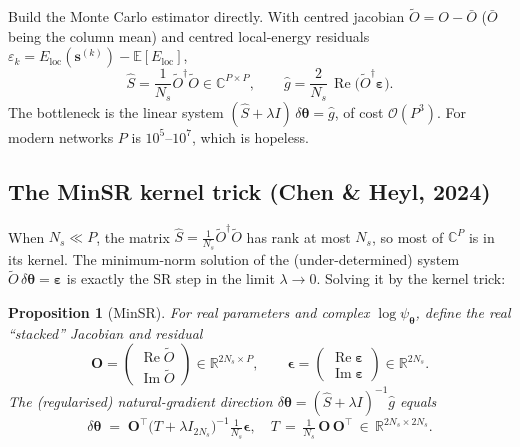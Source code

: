 \documentclass[11pt,a4paper]{article}
\newcommand{\R}{\mathbb{R}}
\newcommand{\C}{\mathbb{C}}
\newcommand{\E}{\mathbb{E}}
\newcommand{\bs}{\bm{s}}
\newcommand{\btheta}{\bm{\theta}}
\newcommand{\psip}{\psi_{\btheta}}
\newcommand{\Eloc}{E_{\mathrm{loc}}}
\DeclareMathOperator{\Real}{Re}
\DeclareMathOperator{\Imag}{Im}
\theoremstyle{definition}
\theoremstyle{plain}
\newtheorem{proposition}{Proposition}
\begin{document}
Build the Monte Carlo estimator directly. With centred jacobian
$\widetilde O = O - \bar O$ ($\bar O$ being the column mean) and centred
local-energy residuals $\varepsilon_{k} = \Eloc(\bs^{(k)}) - \E[\Eloc]$,
\begin{equation}
   \widehat S = \frac{1}{N_{s}}\widetilde O^{\dagger}\widetilde O \in \C^{P\times P},
   \qquad
   \widehat g = \frac{2}{N_{s}}\,\Real\bigl(\widetilde O^{\dagger}\bm{\varepsilon}\bigr).
\end{equation}
The bottleneck is the linear system $(\widehat S + \lambda I)\,\delta\btheta = \widehat g$,
of cost $\mathcal O(P^{3})$. For modern networks $P$ is $10^{5}$--$10^{7}$,
which is hopeless.

\subsection{The MinSR kernel trick (Chen \& Heyl, 2024)}

When $N_{s} \ll P$, the matrix $\widehat S = \tfrac{1}{N_{s}} \widetilde O^{\dagger}\widetilde O$
has rank at most $N_{s}$, so most of $\C^{P}$ is in its kernel. The
minimum-norm solution of the (under-determined) system
$\widetilde O\,\delta\btheta = \bm{\varepsilon}$ is exactly the SR step in
the limit $\lambda \to 0$. Solving it by the kernel trick:

\begin{proposition}[MinSR]
For real parameters and complex $\log\psip$, define the
real ``stacked'' Jacobian and residual
\begin{equation}
   \mathbf O =
   \begin{pmatrix}\Real \widetilde O \\ \Imag \widetilde O\end{pmatrix} \in \R^{2N_{s}\times P},
   \qquad
   \bm{\epsilon} =
   \begin{pmatrix}\Real\bm\varepsilon \\ \Imag\bm\varepsilon\end{pmatrix} \in \R^{2N_{s}}.
\end{equation}
The (regularised) natural-gradient direction $\delta\btheta = (\widehat S + \lambda I)^{-1} \widehat g$ equals
\begin{equation}
\boxed{\;
   \delta\btheta
   \;=\; \mathbf O^{\!\top}
         \bigl(T + \lambda I_{2N_{s}}\bigr)^{-1}
         \tfrac{1}{N_{s}}\bm{\epsilon},
   \quad
   T \,=\, \tfrac{1}{N_{s}}\,\mathbf O\,\mathbf O^{\!\top}\,\in\,\R^{2N_{s}\times 2N_{s}}.
\;}
\label{eq:minsr}
\end{equation}
\end{proposition}
\end{document}
